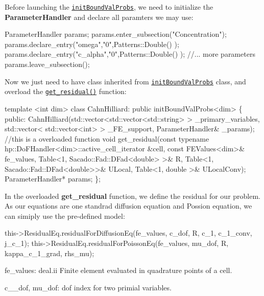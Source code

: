  Before launching the \href{../html/classinit_bound_val_probs.html}{\tt init\-Bound\-Val\-Probs}, we need to initialize the {\bfseries Parameter\-Handler} and declare all paramters we may use\-: 
\begin{DoxyCode}
ParameterHandler params;
params.enter\_subsection(\textcolor{stringliteral}{"Concentration"});   
params.declare\_entry(\textcolor{stringliteral}{"omega"},\textcolor{stringliteral}{"0"},Patterns::Double() );
params.declare\_entry(\textcolor{stringliteral}{"c\_alpha"},\textcolor{stringliteral}{"0"},Patterns::Double() );
\textcolor{comment}{//... more parameters }
params.leave\_subsection();  
\end{DoxyCode}
 Now we just need to have class inherited from \href{../html/classinit_bound_val_probs.html}{\tt init\-Bound\-Val\-Probs} class, and overload the \href{../html/classinit_bound_val_probs.html#ac8f2c3e2a1040c70b709900dc3dfdaea}{\tt get\-\_\-residual()} function\-: 
\begin{DoxyCode}
\textcolor{keyword}{template} <\textcolor{keywordtype}{int} dim>
\textcolor{keyword}{class }CahnHilliard: \textcolor{keyword}{public} initBoundValProbs<dim>
\{
    \textcolor{keyword}{public}:
        CahnHilliard(std::vector<std::vector<std::string> > \_primary\_variables, std::vector<
      std::vector<int> > \_FE\_support, ParameterHandler& \_params);
        \textcolor{comment}{//this is a overloaded function }
        \textcolor{keywordtype}{void} get\_residual(\textcolor{keyword}{const} \textcolor{keyword}{typename} hp::DoFHandler<dim>::active\_cell\_iterator &cell, \textcolor{keyword}{const} 
      FEValues<dim>& fe\_values, Table<1, Sacado::Fad::DFad<double> >& R, Table<1, Sacado::Fad::DFad<double>>& ULocal, 
      Table<1, double >& ULocalConv);
        ParameterHandler* params;       
\};
\end{DoxyCode}
 In the overloaded {\bfseries get\-\_\-residual} function, we define the residual for our problem. As our equations are one standrad diffusion equation and Possion equation, we can simiply use the pre-\/defined model\-: 
\begin{DoxyCode}
this->ResidualEq.residualForDiffusionEq(fe\_values, c\_dof, R, c\_1, c\_1\_conv, j\_c\_1);
this->ResidualEq.residualForPoissonEq(fe\_values, mu\_dof, R, kappa\_c\_1\_grad, rhs\_mu);
\end{DoxyCode}
 fe\-\_\-values\-: deal.\-ii Finite element evaluated in quadrature points of a cell.

c\-\_\-\_\-dof, mu\-\_\-dof\-: dof index for two primial variables.

